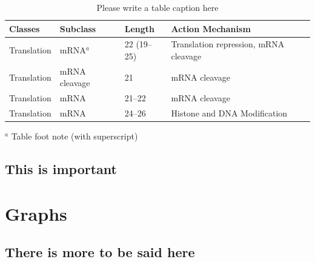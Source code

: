 \begin{appendices}
  \begin{table}[!htp]
    \caption{Please write a table caption here}
    \label{tab:A:1}
    \begin{tabular*}{14.0cm}{p{2.0cm}p{2.5cm}p{2.0cm}p{7.5cm}}
      \toprule
      Classes & Subclass & Length & Action Mechanism  \\
      \midrule
      Translation & mRNA$^a$  & 22 (19--25) & Translation repression, mRNA cleavage\\
      Translation & mRNA cleavage & 21 & mRNA cleavage\\
      Translation & mRNA  & 21--22 & mRNA cleavage\\
      Translation & mRNA  & 24--26 & Histone and DNA Modification\\
      \bottomrule
    \end{tabular*}
    $^a$ Table foot note (with superscript)
  \end{table}

    \subsection{This is important}
  \section{Graphs}
    \subsection{There is more to be said here}
\end{appendices}
